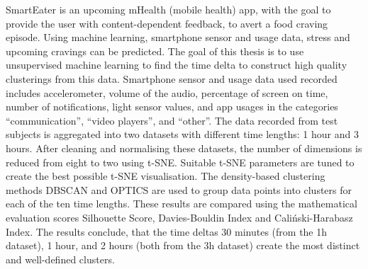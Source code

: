 
SmartEater is an upcoming mHealth (mobile health) app, with the goal to provide the user with content-dependent feedback, to avert a food craving episode. Using machine learning,  smartphone sensor and usage data, stress and upcoming cravings can be predicted. The goal of this thesis is to use unsupervised machine learning to find the time delta to construct high quality clusterings from this data. Smartphone sensor and usage data used recorded includes accelerometer, volume of the audio, percentage of screen on time, number of notifications, light sensor values, and app usages in the categories “communication”, “video players”, and “other”. The data recorded from test subjects is aggregated into two datasets with different time lengths: 1 hour and 3 hours. After cleaning and normalising these datasets, the number of dimensions is reduced from eight to two using t-SNE. Suitable t-SNE parameters are tuned to create the best possible t-SNE visualisation. The density-based clustering methods DBSCAN and OPTICS are used to group data points into clusters for each of the ten time lengths. These results are compared using the mathematical evaluation scores Silhouette Score, Davies-Bouldin Index and Caliński-Harabasz Index. The results conclude, that the time deltas 30 minutes (from the 1h dataset), 1 hour, and 2 hours (both from the 3h dataset) create the most distinct and well-defined clusters.
